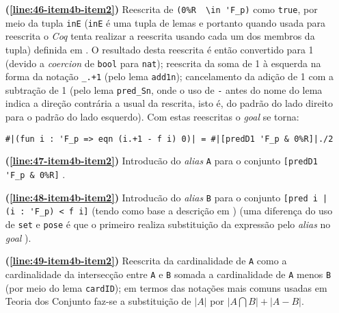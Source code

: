 \begin{enumerate}[label=\textbf{\roman*.}]
\begin{enumerate}[label=\textbf{\roman{enumi}.(\alph*)}]
\begin{enumerate}[label=\textbf{(\alph{enumii}.\arabic*)}]
\begin{enumerate}[listparindent=\parindent]
                                \item[\textbf{(\ref{line:46-item4b-item2})}] Reescrita de \lstinline[language=coq]!(0%R  \in 'F_p)! como \lstinline[language=coq]!true!, por meio da tupla \lstinline[language=coq]!inE! (\lstinline[language=coq]!inE! é uma tupla de lemas e portanto quando usada para reescrita o \textit{Coq} tenta realizar a reescrita usando cada um dos membros da tupla) definida em \cite{mathcomp-finset}. O resultado desta reescrita é então convertido para 1 (devido a \textit{coercion} de \lstinline[language=coq]!bool! para \lstinline[language=coq]!nat!); reescrita da soma de 1 à esquerda na forma da notação \lstinline[language=coq]!_.+1! (pelo lema \lstinline[language=coq]!add1n!); cancelamento da adição de 1 com a subtração de 1 (pelo lema \lstinline[language=coq]!pred_Sn!, onde o uso de \lstinline[language=coq]|-| antes do nome do lema indica a direção contrária a usual da rescrita, isto é, do padrão do lado direito para o padrão do lado esquerdo). Com estas reescritas o \textit{goal} se torna:
                                        \begin{lstlisting}[language=coq,frame=single,tabsize=1]
#|(fun i : 'F_p => eqn (i.+1 - f i) 0)| = #|[predD1 'F_p & 0%R]|./2
                                        \end{lstlisting}
                                
                                \item[\textbf{(\ref{line:47-item4b-item2})}] Introducão do \textit{alias} \lstinline[language=coq]|A| para o conjunto \lstinline[language=coq]|[predD1 'F_p & 0%R]| \cite{coqteam2022manual}.
                                
                                \item[\textbf{(\ref{line:48-item4b-item2})}] Introducão do \textit{alias} \lstinline[language=coq]|B| para o conjunto \lstinline[language=coq]![pred i |  (i : 'F_p) < f i]! (tendo como base a descrição em \cite{coq-ssrbool})
                                 (uma diferença do uso de \lstinline[language=coq]|set| e \lstinline[language=coq]|pose| é que o primeiro realiza substituição da expressão pelo \textit{alias} no \textit{goal} \cite{coqteam2022manual}).
                                
                                \item[\textbf{(\ref{line:49-item4b-item2})}] Reescrita da cardinalidade de \lstinline[language=coq]!A! como a cardinalidade da intersecção entre \lstinline[language=coq]!A! e \lstinline[language=coq]!B! somada a cardinalidade de \lstinline[language=coq]!A! menos \lstinline[language=coq]!B! (por meio do lema \lstinline[language=coq]!cardID!); em termos das notações mais comuns usadas em Teoria dos Conjunto faz-se a substituição de $|A|$ por $|A \bigcap B| + |A - B|$.
                                

\end{enumerate}
\end{enumerate}
\end{enumerate}
\end{enumerate}
